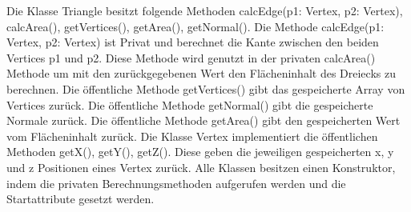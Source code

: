 \documentclass[a4paper,11pt]{scrartcl}
\begin{document}
	Die Klasse Triangle besitzt folgende Methoden  calcEdge(p1: Vertex, p2: Vertex), calcArea(), getVertices(), getArea(), getNormal(). Die Methode calcEdge(p1: Vertex, p2: Vertex) ist Privat und berechnet die Kante zwischen den beiden Vertices p1 und p2. Diese Methode wird genutzt in der privaten calcArea() Methode um mit den zurückgegebenen Wert den Flächeninhalt des Dreiecks zu berechnen. Die öffentliche Methode  getVertices() gibt das gespeicherte Array von Vertices zurück. Die öffentliche Methode getNormal() gibt die gespeicherte Normale zurück. Die öffentliche  Methode getArea() gibt den gespeicherten Wert vom Flächeninhalt zurück. Die Klasse Vertex implementiert die öffentlichen Methoden getX(), getY(), getZ(). Diese geben die jeweiligen gespeicherten x, y und z Positionen eines Vertex zurück. Alle Klassen besitzen einen Konstruktor, indem die privaten Berechnungsmethoden aufgerufen werden und die Startattribute gesetzt werden.
	
	
\end{document}
